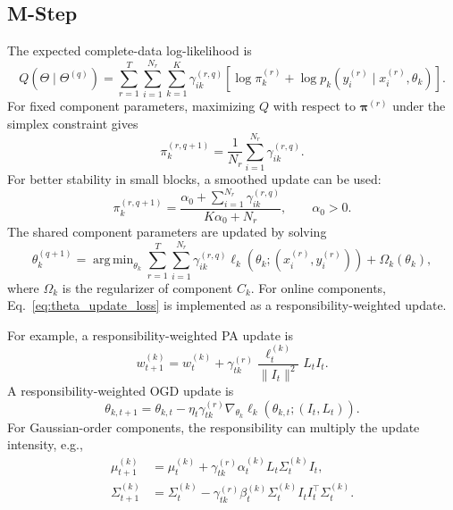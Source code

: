 ﻿\documentclass[12pt,a4paper]{article}
\DeclareMathOperator*{\argmin}{arg\,min}
\begin{document}
\subsection{M-Step}
The expected complete-data log-likelihood is
\begin{equation}
Q(\Theta\mid\Theta^{(q)})=
\sum_{r=1}^{T}\sum_{i=1}^{N_r}\sum_{k=1}^{K}
\gamma_{ik}^{(r,q)}
\left[
\log\pi_k^{(r)}+
\log p_k(y_i^{(r)}\mid x_i^{(r)},\theta_k)
\right].
\label{eq:q_function}
\end{equation}
For fixed component parameters, maximizing $Q$ with respect to
$\boldsymbol{\pi}^{(r)}$ under the simplex constraint gives
\begin{equation}
\pi_k^{(r,q+1)}=\frac{1}{N_r}\sum_{i=1}^{N_r}\gamma_{ik}^{(r,q)}.
\label{eq:pi_update}
\end{equation}
For better stability in small blocks, a smoothed update can be used:
\begin{equation}
\pi_k^{(r,q+1)}=
\frac{\alpha_0+\sum_{i=1}^{N_r}\gamma_{ik}^{(r,q)}}{K\alpha_0+N_r},
\qquad \alpha_0>0.
\label{eq:pi_smooth_update}
\end{equation}
The shared component parameters are updated by solving
\begin{equation}
\theta_k^{(q+1)}=
\argmin_{\theta_k}
\sum_{r=1}^{T}\sum_{i=1}^{N_r}
\gamma_{ik}^{(r,q)}\ell_k(\theta_k;(x_i^{(r)},y_i^{(r)}))
+\Omega_k(\theta_k),
\label{eq:theta_update_loss}
\end{equation}
where $\Omega_k$ is the regularizer of component $C_k$. For online
components, Eq.~\eqref{eq:theta_update_loss} is implemented as a
responsibility-weighted update.

For example, a responsibility-weighted PA update is
\begin{equation}
 w_{t+1}^{(k)}=w_t^{(k)}+
 \gamma_{tk}^{(r)}\frac{\ell_t^{(k)}}{\|I_t\|^2}L_tI_t.
 \label{eq:weighted_pa_update}
\end{equation}
A responsibility-weighted OGD update is
\begin{equation}
\theta_{k,t+1}=\theta_{k,t}-\eta_t\gamma_{tk}^{(r)}
\nabla_{\theta_k}\ell_k(\theta_{k,t};(I_t,L_t)).
\label{eq:weighted_ogd_update}
\end{equation}
For Gaussian-order components, the responsibility can multiply the update
intensity, e.g.,
\begin{align}
\mu_{t+1}^{(k)} &= \mu_t^{(k)}+
\gamma_{tk}^{(r)}\alpha_t^{(k)} L_t\Sigma_t^{(k)} I_t,\label{eq:weighted_cw_mu}\\
\Sigma_{t+1}^{(k)} &= \Sigma_t^{(k)}-
\gamma_{tk}^{(r)}\beta_t^{(k)}
\Sigma_t^{(k)}I_tI_t^\top\Sigma_t^{(k)}.
\label{eq:weighted_cw_sigma}
\end{align}
\end{document}
